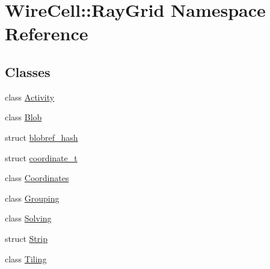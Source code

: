\hypertarget{namespace_wire_cell_1_1_ray_grid}{}\section{Wire\+Cell\+:\+:Ray\+Grid Namespace Reference}
\label{namespace_wire_cell_1_1_ray_grid}
\subsection*{Classes}
\begin{DoxyCompactItemize}
\item 
class \hyperlink{class_wire_cell_1_1_ray_grid_1_1_activity}{Activity}
\item 
class \hyperlink{class_wire_cell_1_1_ray_grid_1_1_blob}{Blob}
\item 
struct \hyperlink{struct_wire_cell_1_1_ray_grid_1_1blobref__hash}{blobref\+\_\+hash}
\item 
struct \hyperlink{struct_wire_cell_1_1_ray_grid_1_1coordinate__t}{coordinate\+\_\+t}
\item 
class \hyperlink{class_wire_cell_1_1_ray_grid_1_1_coordinates}{Coordinates}
\item 
class \hyperlink{class_wire_cell_1_1_ray_grid_1_1_grouping}{Grouping}
\item 
class \hyperlink{class_wire_cell_1_1_ray_grid_1_1_solving}{Solving}
\item 
struct \hyperlink{struct_wire_cell_1_1_ray_grid_1_1_strip}{Strip}
\item 
class \hyperlink{class_wire_cell_1_1_ray_grid_1_1_tiling}{Tiling}
\end{DoxyCompactItemize}
